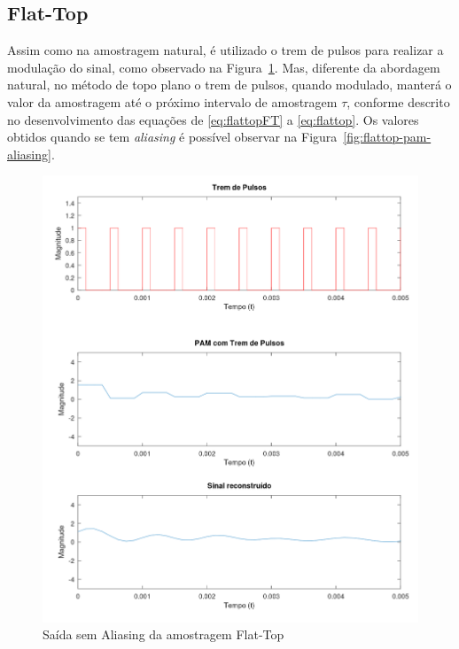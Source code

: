 \subsection{Flat-Top}

Assim como na amostragem natural, é utilizado o trem de pulsos para realizar a modulação do sinal, como observado na Figura~\ref{fig:flattop-pam}. Mas, diferente da abordagem natural, no método de topo plano o trem de pulsos, quando modulado,  manterá o valor da amostragem até o próximo intervalo de amostragem $\tau$, conforme descrito no desenvolvimento das equações de \ref{eq:flattopFT} a  \ref{eq:flattop}. Os valores obtidos quando se tem \textit{aliasing} é possível observar na Figura~\ref{fig:flattop-pam-aliasing}.
\begin{figure}[H]
    \centering
    \includegraphics[width=0.8\linewidth]{03_results/octave_results/flattop_sampling.png}
    \caption{Saída sem Aliasing da amostragem Flat-Top}
    \label{fig:flattop-pam}
\end{figure}

